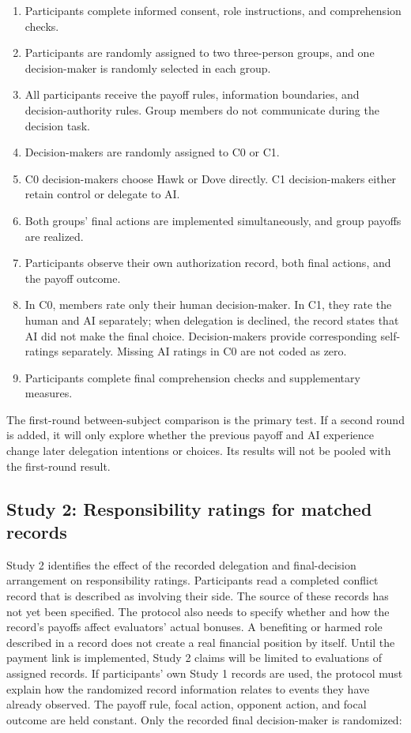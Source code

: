 \documentclass[11pt,a4paper]{article}
\begin{document}
\begin{enumerate}
\item Participants complete informed consent, role instructions, and comprehension checks.
\item Participants are randomly assigned to two three-person groups, and one decision-maker is randomly selected in each group.
\item All participants receive the payoff rules, information boundaries, and decision-authority rules. Group members do not communicate during the decision task.
\item Decision-makers are randomly assigned to C0 or C1.
\item C0 decision-makers choose Hawk or Dove directly. C1 decision-makers either retain control or delegate to AI.
\item Both groups' final actions are implemented simultaneously, and group payoffs are realized.
\item Participants observe their own authorization record, both final actions, and the payoff outcome.
\item In C0, members rate only their human decision-maker. In C1, they rate the human and AI separately; when delegation is declined, the record states that AI did not make the final choice. Decision-makers provide corresponding self-ratings separately. Missing AI ratings in C0 are not coded as zero.
\item Participants complete final comprehension checks and supplementary measures.
\end{enumerate}

The first-round between-subject comparison is the primary test. If a second round is added, it will only explore whether the previous payoff and AI experience change later delegation intentions or choices. Its results will not be pooled with the first-round result.

\subsection{Study 2: Responsibility ratings for matched records}

Study 2 identifies the effect of the recorded delegation and final-decision arrangement on responsibility ratings. Participants read a completed conflict record that is described as involving their side. The source of these records has not yet been specified. The protocol also needs to specify whether and how the record's payoffs affect evaluators' actual bonuses. A benefiting or harmed role described in a record does not create a real financial position by itself. Until the payment link is implemented, Study 2 claims will be limited to evaluations of assigned records. If participants' own Study 1 records are used, the protocol must explain how the randomized record information relates to events they have already observed. The payoff rule, focal action, opponent action, and focal outcome are held constant. Only the recorded final decision-maker is randomized:
\end{document}
